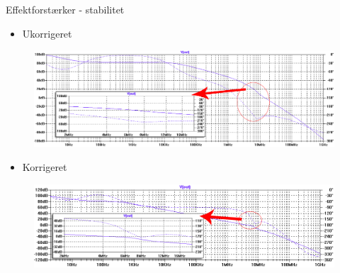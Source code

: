 \begin{frame}{Effektforstærker - stabilitet}

\begin{itemize}
\item Ukorrigeret
\end{itemize}
\begin{figure}[h]
\centering
\includegraphics[width=\textwidth]{images/stabilitet-udenc-graf.png}
\end{figure}

\begin{itemize}
\item Korrigeret
\end{itemize}
\begin{figure}[h]
\centering
\includegraphics[width=\textwidth]{images/stabilitet-medc-graf.png}
\end{figure}

\end{frame}


